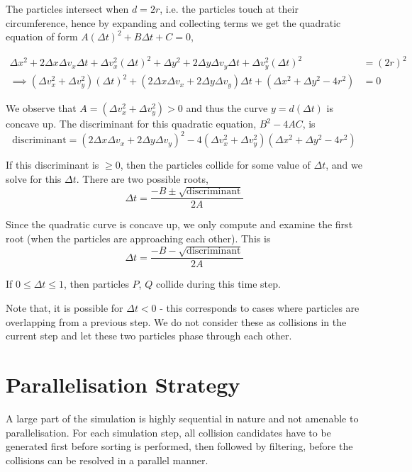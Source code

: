\documentclass[12pt]{article}
\begin{document}
\begin{enumerate}
	The particles intersect when $d = 2r$, i.e. the particles touch at their circumference, hence by expanding and collecting terms we get the quadratic equation of form $A (\Delta t)^2 + B \Delta t + C = 0$,
	
	\begin{align*}
		\Delta x^2 + 2 \Delta x \Delta v_x \Delta t + \Delta v_x^2 (\Delta t)^2 + \Delta y^2 + 2 \Delta y \Delta v_y \Delta t + \Delta v_y^2 (\Delta t)^2 &= (2r)^2 \\
		\implies (\Delta v_x^2 + \Delta v_y^2) (\Delta t)^2 + (2 \Delta x \Delta v_x + 2 \Delta y \Delta v_y) \Delta t + (\Delta x^2 + \Delta y^2 - 4r^2) &= 0
	\end{align*}
	
	We observe that $A = (\Delta v_x^2 + \Delta v_y^2) > 0$ and thus the curve $y = d(\Delta t)$ is concave up. The discriminant for this quadratic equation, $B^2 - 4AC$, is
	$$\textrm{discriminant} = (2 \Delta x \Delta v_x + 2 \Delta y \Delta v_y)^2 - 4(\Delta v_x^2 + \Delta v_y^2)(\Delta x^2 + \Delta y^2 - 4r^2)$$
	
	If this discriminant is $\geq 0$, then the particles collide for some value of $\Delta t$, and we solve for this $\Delta t$. There are two possible roots,
	$$\Delta t = \frac{-B \pm \sqrt{\textrm{discriminant}}}{2A}$$
	
	Since the quadratic curve is concave up, we only compute and examine the first root (when the particles are approaching each other). This is
	$$\Delta t = \frac{-B - \sqrt{\textrm{discriminant}}}{2A}$$
	
	If $0 \leq \Delta t \leq 1$, then particles $P$, $Q$ collide during this time step.
	
	Note that, it is possible for $\Delta t < 0$ - this corresponds to cases where particles are overlapping from a previous step. We do not consider these as collisions in the current step and let these two particles phase through each other.
\end{enumerate}

\pagebreak

\section{Parallelisation Strategy}

A large part of the simulation is highly sequential in nature and not amenable to parallelisation. For each simulation step, all collision candidates have to be generated first before sorting is performed, then followed by filtering, before the collisions can be resolved in a parallel manner. \\
\end{document}

